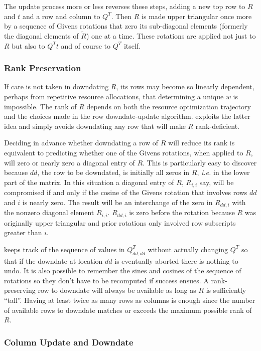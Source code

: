 The update process more or less reverses these steps, adding a new top row to $R$ and $t$ and a row and column to $Q^T$.
Then $R$ is made upper triangular once more by a sequence of Givens rotations that zero its sub-diagonal elements
(formerly the diagonal elements of $\tilde{R}$) one at a time.
These rotations are applied not just to $R$ but also to $Q^Tt$ and of course to $Q^T$ itself.

\subsubsection{Rank Preservation}

If care is not taken in downdating $R$, its rows may become so linearly dependent,
perhaps from repetitive resource allocations,
that determining a unique $w$ is impossible.
The rank of $R$ depends on both the resource optimization trajectory and the
choices made in the row downdate-update algorithm.
\pacora exploits the latter idea and simply avoids downdating any row that will make $R$ rank-deficient.

Deciding in advance whether downdating a row of $R$ will reduce its rank
is equivalent to predicting whether one of the Givens rotations, when applied to $R$,
will zero or nearly zero a diagonal entry of $R$.
This is particularly easy to discover because $dd$, the row to be downdated, is initially all zeros in $R$,
\emph{i.e.} in the lower part of the matrix.
In this situation a diagonal entry of $R$, $R_{i,i}$ say, will be compromised if and only if the
cosine of the Givens rotation that involves rows $dd$ and $i$ is nearly zero.
The result will be an interchange of the zero in $R_{dd,i}$ with the nonzero diagonal element $R_{i,i}$.
$R_{dd,i}$ is zero before the rotation because
$R$ was originally upper triangular and prior rotations only involved row subscripts greater than $i$.

\pacora keeps track of the sequence of values in $Q^T_{dd,dd}$ without actually changing $Q^T$
so that if the downdate at location $dd$ is eventually aborted there is nothing to undo.
It is also possible to remember the sines and cosines of the sequence of rotations
so they don't have to be recomputed if success ensues.
A rank-preserving row to downdate will always be available as long as $R$ is sufficiently ``tall''.
Having at least twice as many rows as columns is enough since the number of available rows to downdate
matches or exceeds the maximum possible rank of $R$.

\subsubsection{Column Update and Downdate}

